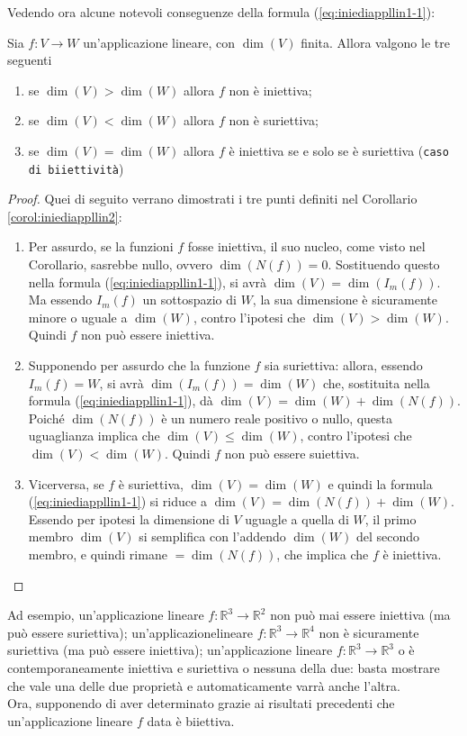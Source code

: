 Vedendo ora alcune notevoli conseguenze della formula (\ref{eq:iniediappllin1-1}):
\begin{corol}
  \label{corol:iniediappllin2}
  Sia $f:V\to W$ un'applicazione lineare, con $\dim (V)$ finita.
  Allora valgono le tre seguenti
  \begin{enumerate}[label=(\roman*)]
  \item se $\dim(V)>\dim(W)$ allora $f$ non è iniettiva;
  \item se $\dim(V)<\dim(W)$ allora $f$ non è suriettiva;
  \item se $\dim(V)=\dim(W)$ allora $f$ è iniettiva se e solo se è suriettiva (\texttt{caso di
      biiettività})
  \end{enumerate}
\end{corol}
\begin{proof}
  Quei di seguito verrano dimostrati i tre punti definiti nel Corollario \ref{corol:iniediappllin2}:
  \begin{enumerate}[label=(\roman*)]
  \item Per assurdo, se la funzioni $f$ fosse iniettiva, il suo nucleo, come visto nel Corollario,
    sasrebbe nullo, ovvero $\dim(N(f))=0$. Sostituendo questo nella formula (\ref{eq:iniediappllin1-1}),
    si avrà $\dim(V)=\dim(I_m(f))$. Ma essendo $I_m(f)$ un sottospazio di $W$, la sua dimensione è
    sicuramente minore o uguale a $\dim(W)$, contro l'ipotesi che $\dim(V)>\dim(W)$. Quindi $f$ non può
    essere iniettiva.
  \item Supponendo per assurdo che la funzione $f$ sia suriettiva: allora, essendo $I_m(f)=W$, si avrà
    $\dim(I_m(f))=\dim(W)$ che, sostituita nella formula (\ref{eq:iniediappllin1-1}), dà $\dim (V)=
    \dim(W)+\dim(N(f))$. Poiché $\dim(N(f))$ è un numero reale positivo o nullo, questa uguaglianza
    implica che $\dim(V)\leq \dim(W)$, contro l'ipotesi che $\dim(V)<\dim(W)$. Quindi $f$ non può essere
    suiettiva.
  \item Vicerversa, se $f$ è suriettiva, $\dim(V)=\dim(W)$ e quindi la formula
    (\ref{eq:iniediappllin1-1}) si riduce a $\dim(V)=\dim(N(f))+\dim(W)$. Essendo per ipotesi la
    dimensione di $V$ uguagle a quella di $W$, il primo membro $\dim(V)$ si semplifica con l'addendo
    $\dim(W)$ del secondo membro, e quindi rimane $=\dim(N(f))$, che implica che $f$ è iniettiva.
  \end{enumerate}
\end{proof}
Ad esempio, un'applicazione lineare $f:\mathds{R}^3\to\mathds{R}^2$ non può mai essere iniettiva
(ma può essere suriettiva); un'applicazionelineare $f:\mathds{R}^3\to\mathds{R}^4$ non è sicuramente
suriettiva (ma può essere iniettiva); un'applicazione lineare $f:\mathds{R}^3\to\mathds{R}^3$ o è
contemporaneamente iniettiva e suriettiva o nessuna della due: basta mostrare che vale una delle due
proprietà e automaticamente varrà anche l'altra.\\
Ora, supponendo di aver determinato grazie ai risultati precedenti che un'applicazione lineare
$f$ data è biiettiva.

